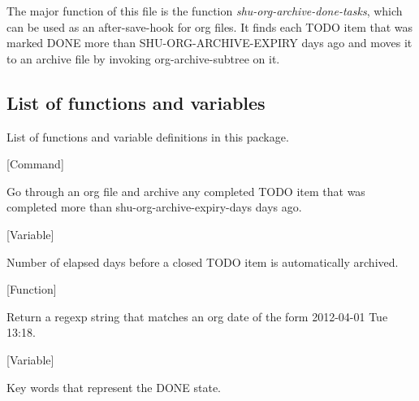 The major function of this file is the function \emph{shu-org-archive-done-tasks},
which can be used as an after-save-hook for org files.  It finds each
TODO item that was marked DONE more than SHU-ORG-ARCHIVE-EXPIRY days
ago and moves it to an archive file by invoking org-archive-subtree
on it.


\subsection{List of functions and variables}

List of functions and variable definitions in this package.



\vspace{1em}
\noindent
{}
\usebox{\funcname}
 \hfill [Command]

\begin{doc-string}
Go through an org file and archive any completed TODO item that was completed more
than shu-org-archive-expiry-days days ago.
\end{doc-string}

\vspace{1em}
\noindent
{}
\usebox{\funcname}
 \hfill [Variable]

\begin{doc-string}
Number of elapsed days before a closed TODO item is automatically archived.
\end{doc-string}

\vspace{1em}
\noindent
{}
\usebox{\funcname}
 \hfill [Function]

\begin{doc-string}
Return a regexp string that matches an org date of the form 2012-04-01 Tue 13:18.
\end{doc-string}

\vspace{1em}
\noindent
{}
\usebox{\funcname}
 \hfill [Variable]

\begin{doc-string}
Key words that represent the DONE state.
\end{doc-string}

